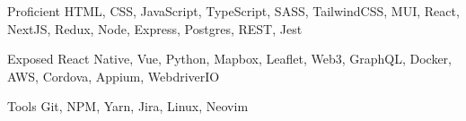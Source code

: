 
\begin{cvskills}
  \cvskill
    {Proficient} %
    {HTML, CSS, JavaScript, TypeScript, SASS, TailwindCSS, MUI, React, NextJS, Redux, Node, Express, Postgres, REST, Jest} %

  \cvskill
    {Exposed} %
    {React Native, Vue, Python, Mapbox, Leaflet, Web3, GraphQL, Docker, AWS, Cordova, Appium, WebdriverIO} %

  \cvskill
    {Tools} %
    {Git, NPM, Yarn, Jira, Linux, Neovim} %
\end{cvskills}

